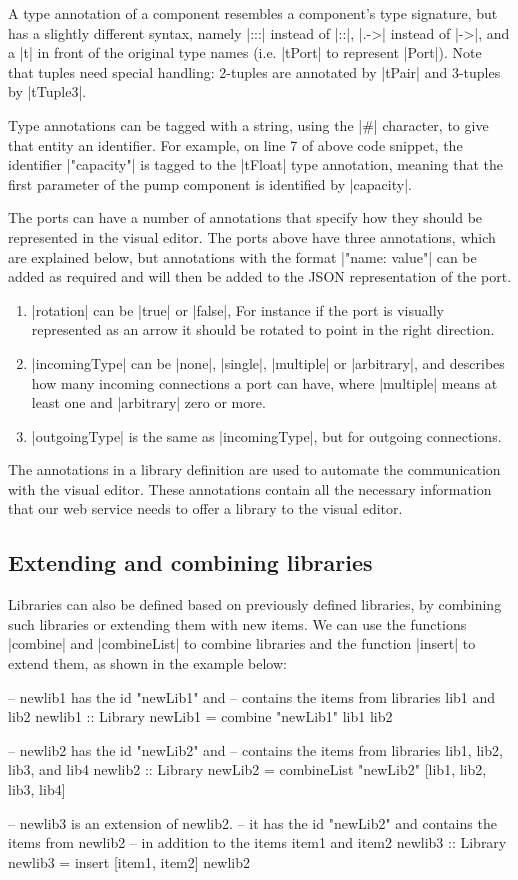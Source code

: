 \documentclass[a4paper]{article}
\begin{document}
A type annotation of a component resembles a component's type signature, but has
a slightly different syntax, namely |:::| instead of |::|, |.->| instead of
|->|, and a |t| in front of the original type names (i.e. |tPort| to represent
|Port|). Note that tuples need special handling: 2-tuples are annotated by
|tPair| and 3-tuples by |tTuple3|.

Type annotations can be tagged with a string,
using the |#| character, to give that entity an identifier.  For example, on
line 7 of above code snippet, the identifier |"capacity"| is tagged to the
|tFloat| type annotation, meaning that the first parameter of the pump component
is identified by |capacity|.

The ports can have a number of annotations that
specify how they should be represented in the visual editor. The ports above
have three annotations, which are explained below, but annotations with the format
|"name: value"| can be added as required and will then be added to the JSON
representation of the port. 
\begin{enumerate}
\item |rotation| can be |true| or |false|, For instance if the port is visually
  represented as an arrow it should be rotated to point in the right direction.
\item |incomingType| can be |none|, |single|, |multiple| or |arbitrary|, and
  describes how many incoming connections a port can have, where |multiple|
  means at least one and |arbitrary| zero or more. 
\item |outgoingType| is the same as |incomingType|, but for outgoing connections.
\end{enumerate}

The annotations in a library definition are used to automate the communication
with the visual editor. These annotations contain all the necessary information
that our web service needs to offer a library to the visual editor. 

\subsection{Extending and combining libraries}
Libraries can also be defined based on previously defined libraries, by
combining such libraries or extending them with new items.
We can use the functions |combine| and |combineList| to combine libraries and
the function |insert| to extend them, as shown in the example below:

\begin{haskellcode}
-- newlib1 has the id "newLib1" and 
-- contains the items from libraries lib1 and lib2
newlib1 :: Library
newLib1 = combine "newLib1" lib1 lib2

-- newlib2 has the id "newLib2" and 
-- contains the items from libraries lib1, lib2, lib3, and lib4
newlib2 :: Library
newLib2 = combineList "newLib2" [lib1, lib2, lib3, lib4]

-- newlib3 is an extension of newlib2.
-- it has the id "newLib2" and contains the items from newlib2
-- in addition to the items item1 and item2
newlib3 :: Library
newlib3 = insert [item1, item2] newlib2
\end{haskellcode}
\end{document}
